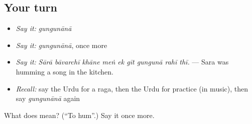 \subsection*{Your turn}
\begin{itemize}
\raggedright
  \item \emph{Say it:} \emph{gungunānā}
  \item \emph{Say it:} \emph{gungunānā}, once more
  \item \emph{Say it:} \emph{Sārā bāvarchī khāne meṅ ek gīt gungunā rahī thī.} — Sara was humming a song in the kitchen.
  \item \emph{Recall:} say the Urdu for a raga, then the Urdu for practice (in music), then say \emph{gungunānā} again
\end{itemize}

\begin{tcolorbox}[breakable,colback=teal!4,colframe=teal!35!black,title={Before you move on}]
What does  mean? (\textquotedblleft{}To hum\textquotedblright{}.) Say it once more.
\end{tcolorbox}
